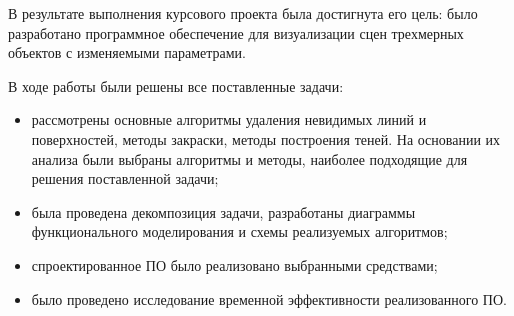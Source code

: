 
В результате выполнения курсового проекта была достигнута его цель: было разработано программное обеспечение для визуализации сцен трехмерных объектов с изменяемыми параметрами. 

В ходе работы были решены все поставленные задачи:
\begin{itemize}
	\item рассмотрены основные алгоритмы удаления невидимых линий и поверхностей, методы закраски, методы построения теней. На основании их анализа были выбраны алгоритмы и методы, наиболее подходящие для решения поставленной задачи;
	\item была проведена декомпозиция задачи, разработаны диаграммы функционального моделирования и схемы реализуемых алгоритмов;
	\item спроектированное ПО было реализовано выбранными средствами;
	\item было проведено исследование временной эффективности реализованного ПО.
\end{itemize}

